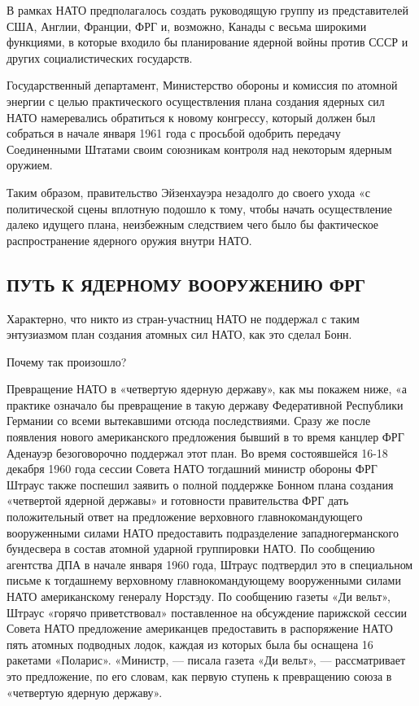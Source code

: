 \documentclass[12pt, a4paper, openany]{book}
\begin{document}
	В рамках НАТО предполагалось создать руководящую группу из представителей США, Англии, Франции, ФРГ и, возможно, Канады с весьма широкими функциями, в которые входило бы планирование ядерной войны против СССР и других социалистических государств.
	
	Государственный департамент, Министерство обороны и комиссия по атомной энергии с целью практического осуществления плана создания ядерных сил НАТО намеревались обратиться к новому конгрессу, который должен был собраться в начале января 1961 года с просьбой одобрить передачу Соединенными Штатами своим союзникам контроля над некоторым ядерным оружием.
	
	Таким образом, правительство Эйзенхауэра незадолго до своего ухода «с политической сцены вплотную подошло к тому, чтобы начать осуществление далеко идущего плана, неизбежным следствием чего было бы фактическое распространение ядерного оружия внутри НАТО.
	
		\subsection[Путь к ядерному вооружению ФРГ]{\center ПУТЬ К ЯДЕРНОМУ ВООРУЖЕНИЮ ФРГ}
	
	
	
	
	Характерно, что никто из стран-участниц НАТО не поддержал с таким энтузиазмом план создания атомных сил НАТО, как это сделал Бонн.
	
	Почему так произошло?
	
	Превращение НАТО в «четвертую ядерную державу», как мы покажем ниже, «а практике означало бы превращение в такую державу Федеративной Республики Германии со всеми вытекавшими отсюда последствиями. Сразу же после появления нового американского предложения бывший в то время канцлер ФРГ Аденауэр безоговорочно поддержал этот план. Во время состоявшейся 16-18 декабря 1960 года сессии Совета НАТО тогдашний министр обороны ФРГ Штраус также поспешил заявить о полной поддержке Бонном плана создания «четвертой ядерной державы» и готовности правительства ФРГ дать положительный ответ на предложение верховного главнокомандующего вооруженными силами НАТО предоставить подразделение западногерманского бундесвера в состав атомной ударной группировки НАТО. По сообщению агентства ДПА в начале января 1960 года, Штраус подтвердил это в специальном письме к тогдашнему верховному главнокомандующему вооруженными силами НАТО американскому генералу Норстэду. По сообщению газеты «Ди вельт», Штраус «горячо приветствовал» поставленное на обсуждение парижской сессии Совета НАТО предложение американцев предоставить в распоряжение НАТО пять атомных подводных лодок, каждая из которых была бы оснащена 16 ракетами «Поларис». «Министр, — писала газета «Ди вельт», — рассматривает это предложение, по его словам, как первую ступень к превращению союза в «четвертую ядерную державу».
	
\end{document}
